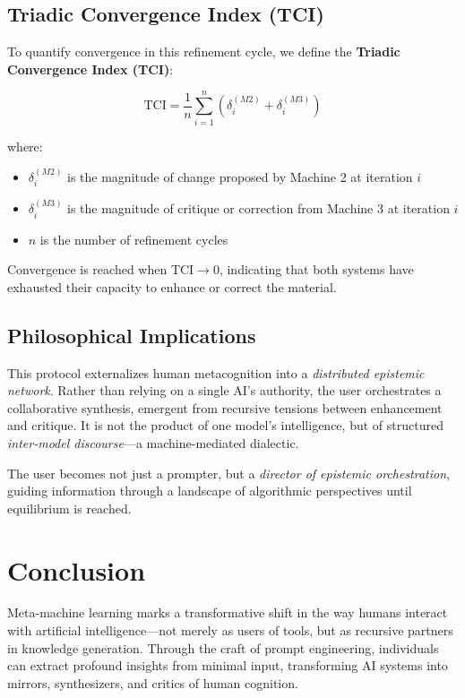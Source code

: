 \documentclass{article}
\begin{document}
\subsection{Triadic Convergence Index (TCI)}

To quantify convergence in this refinement cycle, we define the \textbf{Triadic Convergence Index (TCI)}:

\[
\text{TCI} = \frac{1}{n} \sum_{i=1}^{n} \left( \delta_i^{(M2)} + \delta_i^{(M3)} \right)
\]

where:
\begin{itemize}
    \item \( \delta_i^{(M2)} \) is the magnitude of change proposed by Machine 2 at iteration \( i \)
    \item \( \delta_i^{(M3)} \) is the magnitude of critique or correction from Machine 3 at iteration \( i \)
    \item \( n \) is the number of refinement cycles
\end{itemize}

Convergence is reached when \( \text{TCI} \rightarrow 0 \), indicating that both systems have exhausted their capacity to enhance or correct the material.

\subsection{Philosophical Implications}

This protocol externalizes human metacognition into a \textit{distributed epistemic network}. Rather than relying on a single AI’s authority, the user orchestrates a collaborative synthesis, emergent from recursive tensions between enhancement and critique. It is not the product of one model’s intelligence, but of structured \textit{inter-model discourse}—a machine-mediated dialectic.

The user becomes not just a prompter, but a \emph{director of epistemic orchestration}, guiding information through a landscape of algorithmic perspectives until equilibrium is reached.

\section{Conclusion}

Meta-machine learning marks a transformative shift in the way humans interact with artificial intelligence—not merely as users of tools, but as recursive partners in knowledge generation. Through the craft of prompt engineering, individuals can extract profound insights from minimal input, transforming AI systems into mirrors, synthesizers, and critics of human cognition.
\end{document}
